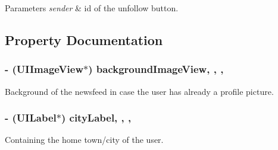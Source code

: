 \begin{DoxyParams}{Parameters}
{\em sender} & id of the unfollow button. \\
\hline
\end{DoxyParams}


\subsection{Property Documentation}
\hypertarget{interface_e_s_account_view_controller_a7c7745ad5fc51771d720bc0905336c10}{}
\subsubsection[{background\+Image\+View}]{\setlength{\rightskip}{0pt plus 5cm}-\/ (U\+I\+Image\+View$\ast$) background\+Image\+View\hspace{0.3cm}{\ttfamily [read]}, {\ttfamily [write]}, {\ttfamily [nonatomic]}, {\ttfamily [strong]}}\label{interface_e_s_account_view_controller_a7c7745ad5fc51771d720bc0905336c10}
Background of the newsfeed in case the user has already a profile picture. \hypertarget{interface_e_s_account_view_controller_a9c2190bbe27cdc3977d8da6074b42f8b}{}
\subsubsection[{city\+Label}]{\setlength{\rightskip}{0pt plus 5cm}-\/ (U\+I\+Label$\ast$) city\+Label\hspace{0.3cm}{\ttfamily [read]}, {\ttfamily [write]}, {\ttfamily [nonatomic]}, {\ttfamily [strong]}}\label{interface_e_s_account_view_controller_a9c2190bbe27cdc3977d8da6074b42f8b}
Containing the home town/city of the user. \hypertarget{interface_e_s_account_view_controller_a13a66b4aca214fc9fc84c5543a84c725}{}
